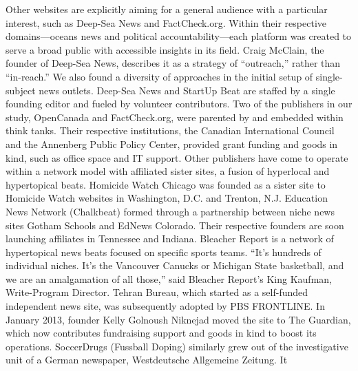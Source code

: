 Other websites are explicitly aiming for a general audience with a particular
interest, such as Deep-Sea News and FactCheck.org. Within their respective
domains—oceans news and political accountability—each platform
was created to serve a broad public with accessible insights in its field. Craig
McClain, the founder of Deep-Sea News, describes it as a strategy of ``outreach,''
rather than ``in-reach.''
We also found a diversity of approaches in the initial setup of single-subject
news outlets. Deep-Sea News and StartUp Beat are staffed by a single
founding editor and fueled by volunteer contributors. Two of the publishers
in our study, OpenCanada and FactCheck.org, were parented by and
embedded within think tanks. Their respective institutions, the Canadian
International Council and the Annenberg Public Policy Center, provided
grant funding and goods in kind, such as office space and IT support.
Other publishers have come to operate within a network model with affiliated
sister sites, a fusion of hyperlocal and hypertopical beats. Homicide
Watch Chicago was founded as a sister site to Homicide Watch websites in
Washington, D.C. and Trenton, N.J. Education News Network (Chalkbeat)
formed through a partnership between niche news sites Gotham Schools
and EdNews Colorado. Their respective founders are soon launching affiliates
in Tennessee and Indiana. Bleacher Report is a network of hypertopical
news beats focused on specific sports teams.
``It’s hundreds of individual niches. It’s the Vancouver Canucks or Michigan
State basketball, and we are an amalgamation of all those,'' said Bleacher
Report’s King Kaufman, Write-Program Director.
Tehran Bureau, which started as a self-funded independent news site, was
subsequently adopted by PBS FRONTLINE. In January 2013, founder
Kelly Golnoush Niknejad moved the site to The Guardian, which now
contributes fundraising support and goods in kind to boost its operations.
SoccerDrugs (Fussball Doping) similarly grew out of the investigative
unit of a German newspaper, Westdeutsche Allgemeine Zeitung. It


